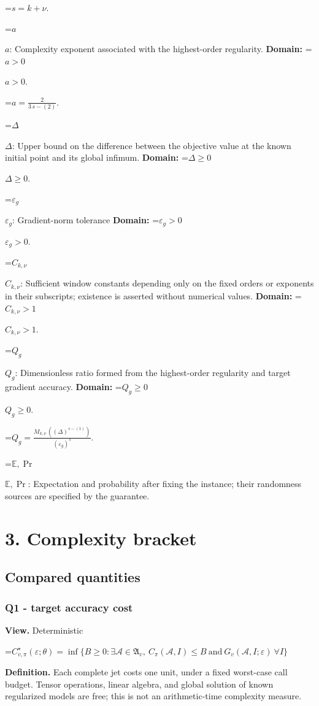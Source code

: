 \documentclass[10pt,a4paper]{article}
\newcommand{\AtlasMath}[1]{\par\begingroup\centering\setbox0=\hbox{$\displaystyle #1$}\ifdim\wd0>1.4\linewidth\typeout{ATLAS WIDE FORMULA: \the\wd0}\fi\ifdim\wd0>\linewidth\resizebox{\linewidth}{!}{\box0}\else\box0\fi\par\endgroup}
\newcommand{\AtlasInlineMath}[1]{\begingroup\setbox0=\hbox{$#1$}\ifdim\wd0>.4\linewidth\endgroup\AtlasMath{#1}\else\endgroup$#1$\fi}
\begin{document}
\AtlasMath{s=k+\nu.}


\AtlasInlineMath{a}: Complexity exponent associated with the highest-order regularity. \textbf{Domain:} \AtlasInlineMath{a>0}.


\AtlasMath{a=\frac{2}{3\,s-(2)}.}


\AtlasInlineMath{\Delta}: Upper bound on the difference between the objective value at the known initial point and its global infimum. \textbf{Domain:} \AtlasInlineMath{\Delta\ge0}.

\AtlasInlineMath{\varepsilon_g}: Gradient-norm tolerance \textbf{Domain:} \AtlasInlineMath{\varepsilon_g>0}.

\AtlasInlineMath{C_{k,\nu}}: Sufficient window constants depending only on the fixed orders or exponents in their subscripts; existence is asserted without numerical values. \textbf{Domain:} \AtlasInlineMath{C_{k,\nu}>1}.

\AtlasInlineMath{Q_g}: Dimensionless ratio formed from the highest-order regularity and target gradient accuracy. \textbf{Domain:} \AtlasInlineMath{Q_g\ge0}.


\AtlasMath{Q_g=\frac{M_{k,\nu}\,((\Delta)^{s-(1)})}{(\varepsilon_g)^{s}}.}


\AtlasInlineMath{\mathbb{E},\Pr}: Expectation and probability after fixing the instance; their randomness sources are specified by the guarantee.

\section{3. Complexity bracket}
\subsection{Compared quantities}
\subsubsection{Q1 - target accuracy cost}
\textbf{View.} Deterministic

\AtlasMath{C^\star_{v,\pi}(\varepsilon;\theta)=\inf\{B\ge0:\exists\mathcal A\in\mathfrak A_v,\ C_\pi(\mathcal A,I)\le B\ \text{and}\ G_v(\mathcal A,I;\varepsilon)\ \forall I\}}
\textbf{Definition.} Each complete jet costs one unit, under a fixed worst-case call budget. Tensor operations, linear algebra, and global solution of known regularized models are free; this is not an arithmetic-time complexity measure.
\end{document}

